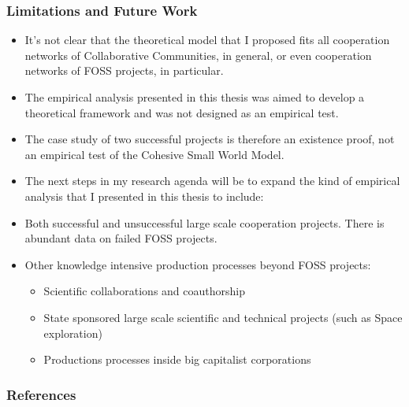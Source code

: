 \documentclass[ignorenonframetext,red,8pt,notes=hide]{beamer}
\begin{document}
\begin{frame}
\frametitle{Limitations and Future Work}

\begin{itemize}

\item It's not clear that the theoretical model that I proposed fits all cooperation networks of Collaborative Communities, in general, or even cooperation networks of FOSS projects, in particular.

\item The empirical analysis presented in this thesis was aimed to develop a theoretical framework and was not designed as an empirical test.

\item The case study of two successful projects is therefore an existence proof, not an empirical test of the Cohesive Small World Model.

\item The next steps in my research agenda will be to expand the kind of empirical analysis that I presented in this thesis to include:

\item Both successful and unsuccessful large scale cooperation projects. There is abundant data on failed FOSS projects.

\item Other knowledge intensive production processes beyond FOSS projects:

\begin{itemize}
\item Scientific collaborations and coauthorship
\item State sponsored large scale scientific and technical projects (such as Space exploration)
\item Productions processes inside big capitalist corporations  
\end{itemize}

\end{itemize}

\end{frame}


\begin{frame}[label=biblio]
\frametitle{References}
\begin{tiny}


\end{tiny}
\end{frame}
\end{document}
